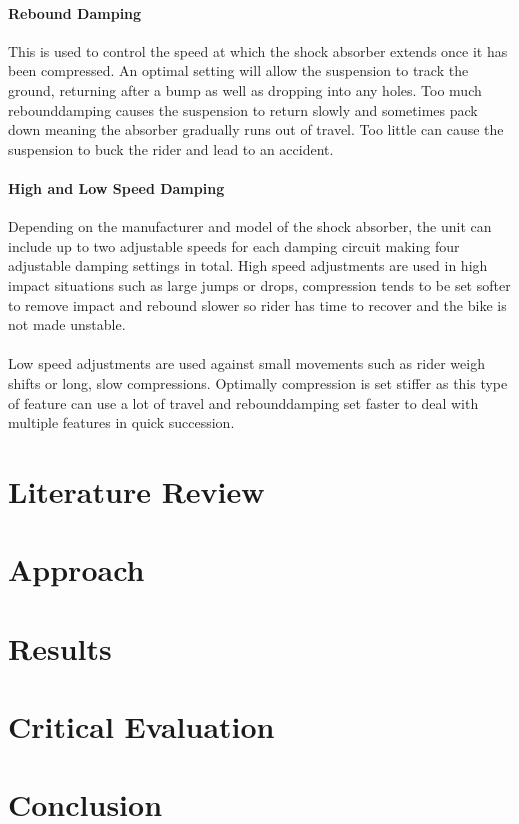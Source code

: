 \documentclass[a4paper, 12pt, hidelinks]{article}
\begin{document}
	\paragraph{Rebound Damping}
		This is used to control the speed at which the shock absorber extends once it has been compressed. An optimal setting will allow the suspension to track the ground, returning after a bump as well as dropping into any holes. Too much \gls{rebounddamping} causes the suspension to return slowly and sometimes pack down meaning the absorber gradually runs out of travel. Too little can cause the suspension to buck the rider and lead to an accident.
	\paragraph{High and Low Speed Damping} 
		Depending on the manufacturer and model of the shock absorber, the unit can include up to two adjustable speeds for each damping circuit making four adjustable damping settings in total. High speed adjustments are used in high impact situations such as large jumps or drops, compression tends to be set softer to remove impact and rebound slower so rider has time to recover and the bike is not made unstable.
		\\\\
		Low speed adjustments are used against small movements such as rider weigh shifts or long, slow compressions. Optimally compression is set stiffer as this type of feature can use a lot of travel and \gls{rebounddamping} set faster to deal with multiple features in quick succession.
	\newpage
	\section{Literature Review}
	\newpage
	\section{Approach}
	\newpage	
	\section{Results}
	\newpage
	\section{Critical Evaluation}
	\newpage
	\section{Conclusion}
	\newpage
		
	\newpage
	\printacronyms
	\printglossary[type=main]
	
\end{document}
